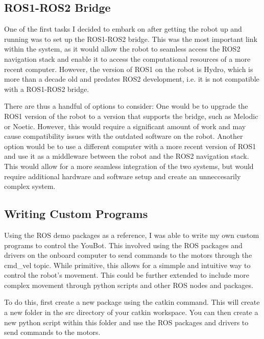 \documentclass[a4paper, 12pt]{article}
\begin{document}
    \pagebreak

    \pagebreak
    \subsection{ROS1-ROS2 Bridge}

    One of the first tasks I decided to embark on after getting the robot up and running was to set up the ROS1-ROS2 bridge. This was the most important link within the system, as it would allow the robot to seamless access the ROS2 navigation stack and enable it to access the computational resources of a more recent computer. However, the version of ROS1 on the robot is Hydro, which is more than a decade old and predates ROS2 development, i.e. it is not compatible with a ROS1-ROS2 bridge. 

    There are thus a handful of options to consider: One would be to upgrade the ROS1 version of the robot to a version that supports the bridge, such as Melodic or Noetic. However, this would require a significant amount of work and may cause compatibility issues with the outdated software on the robot. Another option would be to use a different computer with a more recent version of ROS1 and use it as a middleware between the robot and the ROS2 navigation stack. This would allow for a more seamless integration of the two systems, but would require additional hardware and software setup and create an unneccesarily complex system. 

    \pagebreak

    \subsection{Writing Custom Programs}

    Using the ROS demo packages as a reference, I was able to write my own custom programs to control the YouBot. This involved using the ROS packages and drivers on the onboard computer to send commands to the motors through the \/cmd\_vel topic. While primitive, this allows for a simmple and intuitive way to control the robot's movement. This could be further extended to include more complex movement through python scripts and other ROS nodes and packages.

    To do this, first create a new package using the catkin command. This will create a new folder in the src directory of your catkin workspace. You can then create a new python script within this folder and use the ROS packages and drivers to send commands to the motors.
\end{document}
